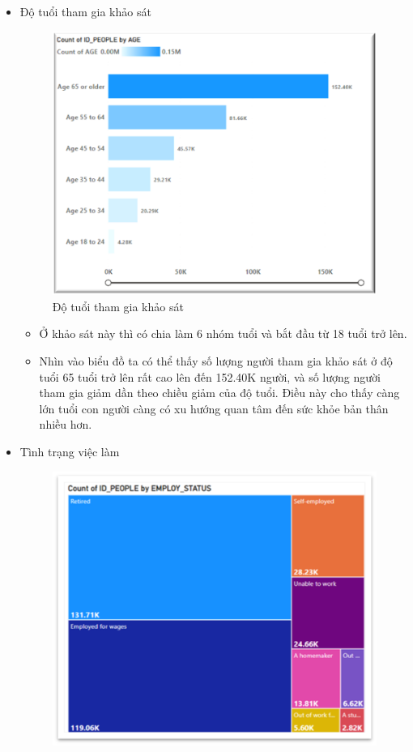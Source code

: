 \begin{itemize}[label=$-$]
\item Độ tuổi tham gia khảo sát 
\begin{center}
            \begin{figure}[!h]
                \centering
                \includegraphics[scale = 0.8]{figures/Hoa/DE1.2.png}
              \caption{Độ tuổi tham gia khảo sát}
            \end{figure}
\end{center}
\begin{itemize}[label=$+$]
\item Ở khảo sát này thì có chia làm 6 nhóm tuổi và bắt đầu từ 18 tuổi trở lên.
\item Nhìn vào biểu đồ ta có thể thấy số lượng người tham gia khảo sát ở độ tuổi 65 tuổi trở lên rất cao lên đến 152.40K người, và số lượng người tham gia giảm dần theo chiều giảm của độ tuổi. Điều này cho thấy càng lớn tuổi con người càng có xu hướng quan tâm đến sức khỏe bản thân nhiều hơn.
\end{itemize}
\item Tình trạng việc làm 
\begin{center}
            \begin{figure}[!h]
                \centering
                \includegraphics[scale = 0.8]{figures/Hoa/DE1.3.png} 

\end{figure}
\end{center}
\end{itemize}
